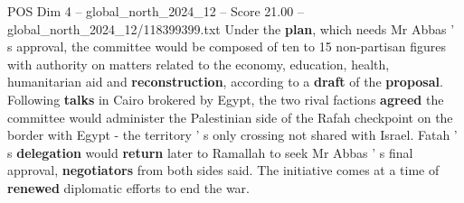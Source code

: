 \begin{textsample}{POS Dim 4 – global\_north\_2024\_12 – Score 21.00 – global\_north\_2024\_12/118399399.txt}
Under the \textbf{plan}, which needs Mr Abbas ' s approval, the committee would be composed of ten to 15 non-partisan figures with authority on matters related to the economy, education, health, humanitarian aid and \textbf{reconstruction}, according to a \textbf{draft} of the \textbf{proposal}.
Following \textbf{talks} in Cairo brokered by Egypt, the two rival factions \textbf{agreed} the committee would administer the Palestinian side of the Rafah checkpoint on the border with Egypt - the territory ' s only crossing not shared with Israel.
Fatah ' s \textbf{delegation} would \textbf{return} later to Ramallah to seek Mr Abbas ' s final approval, \textbf{negotiators} from both sides said.
The initiative comes at a time of \textbf{renewed} diplomatic efforts to end the war.

\end{textsample}
